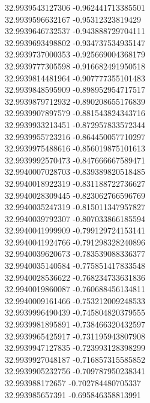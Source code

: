 {32.9939543127306	-0.962441713385501\\
32.9939596632167	-0.95312323819429\\
32.9939646732537	-0.943888729704111\\
32.9939693498802	-0.934737534935147\\
32.9939737000353	-0.925669004368179\\
32.9939777305598	-0.916682491950518\\
32.9939814481964	-0.907777355101483\\
32.9939848595909	-0.898952954717517\\
32.9939879712932	-0.890208655176839\\
32.9939907897579	-0.881543824343716\\
32.9939933213451	-0.872957833572344\\
32.9939955723216	-0.864450057710297\\
32.9939975488616	-0.856019875101613\\
32.9939992570473	-0.847666667589471\\
32.9940007028703	-0.839389820518485\\
32.9940018922319	-0.831188722736627\\
32.9940028309445	-0.823062766596769\\
32.9940035247319	-0.815011347957827\\
32.9940039792307	-0.807033866185594\\
32.9940041999909	-0.799129724153141\\
32.9940041924766	-0.791298328240896\\
32.9940039620673	-0.783539088336377\\
32.9940035140584	-0.775851417833548\\
32.9940028536622	-0.768234733631836\\
32.9940019860087	-0.760688456134811\\
32.9940009161466	-0.753212009248533\\
32.9939996490439	-0.745804820379555\\
32.9939981895891	-0.738466320432597\\
32.9939965425917	-0.731195943807908\\
32.9939947127835	-0.723993128398299\\
32.9939927048187	-0.716857315585852\\
32.9939905232756	-0.709787950238341\\
32.993988172657	-0.702784480705337\\
32.993985657391	-0.695846358813991\\
}
